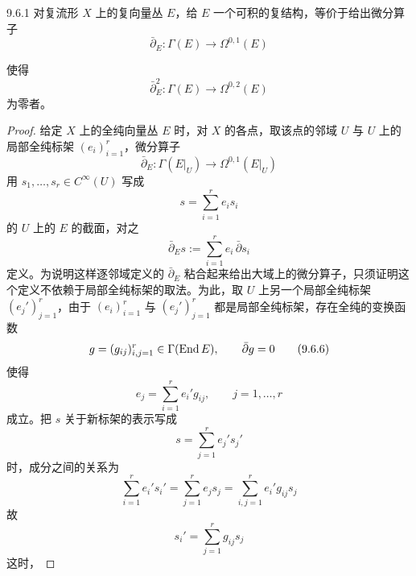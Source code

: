 \begin{theorem*}{9.6.1}
对复流形 $X$ 上的复向量丛 $E$，给 $E$ 一个可积的复结构，等价于给出微分算子
\begin{equation}
  \bar\partial_E\colon \Gamma(E)\to\Omega^{0,1}(E)
  \tag{9.6.1}
\end{equation}

使得
\begin{equation}
  \bar\partial_E^2\colon \Gamma(E)\to\Omega^{0,2}(E)
  \tag{9.6.2}
\end{equation}
为零者。
\end{theorem*}

\begin{proof}
给定 $X$ 上的全纯向量丛 $E$ 时，对 $X$ 的各点，取该点的邻域 $U$ 与 $U$ 上的局部全纯标架 $(e_i)_{i=1}^r$，微分算子
\begin{equation}
  \bar\partial_E\colon \Gamma(E|_U)\to\Omega^{0,1}(E|_U)
  \tag{9.6.3}
\end{equation}
用 $s_1,\dots,s_r\in C^\infty(U)$ 写成
\begin{equation}
  s = \sum_{i=1}^r e_i s_i
  \tag{9.6.4}
\end{equation}
的 $U$ 上的 $E$ 的截面，对之
\begin{equation}
  \bar\partial_E s := \sum_{i=1}^r e_i\,\bar\partial s_i
  \tag{9.6.5}
\end{equation}
定义。为说明这样逐邻域定义的 $\bar\partial_E$ 粘合起来给出大域上的微分算子，只须证明这个定义不依赖于局部全纯标架的取法。为此，取 $U$ 上另一个局部全纯标架 $(e_j')_{j=1}^r$，由于 $(e_i)_{i=1}^r$ 与 $(e_j')_{j=1}^r$ 都是局部全纯标架，存在全纯的变换函数
\begin{equation}
  g = (g_{ij})_{i,j=1}^r \in \Gamma(\operatorname{End} E),\qquad \bar\partial g = 0
  \tag{9.6.6}
\end{equation}
使得
\begin{equation}
  e_j = \sum_{i=1}^r e_i' g_{ij},\qquad j=1,\dots,r
  \tag{9.6.7}
\end{equation}
成立。把 $s$ 关于新标架的表示写成
\begin{equation}
  s = \sum_{j=1}^r e_j' s_j'
  \tag{9.6.8}
\end{equation}
时，成分之间的关系为
\begin{equation}
  \sum_{i=1}^r e_i' s_i' = \sum_{j=1}^r e_j s_j = \sum_{i,j=1}^r e_i' g_{ij} s_j
  \tag{9.6.9}
\end{equation}
故
\begin{equation}
  s_i' = \sum_{j=1}^r g_{ij} s_j
  \tag{9.6.10}
\end{equation}
这时，


\end{proof}
